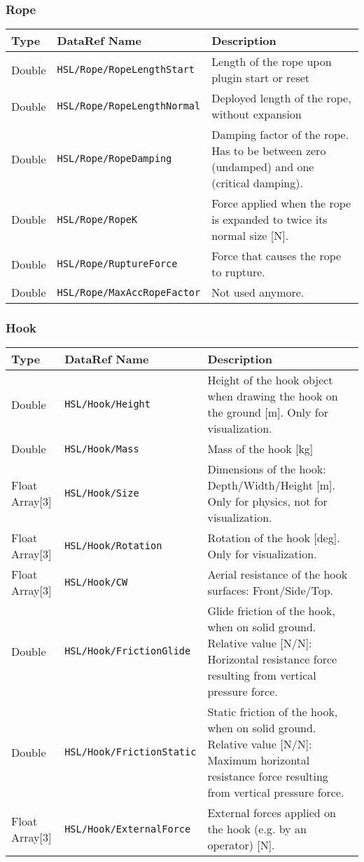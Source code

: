 \documentclass[10pt,a4]{scrartcl}
\begin{document}
\subsubsection{Rope}
\begin{tabularx}{\linewidth}{| l | l | X |} \hline
\textbf{Type} & \textbf{DataRef Name}& \textbf{Description}\\ \hline
Double & \texttt{HSL/Rope/RopeLengthStart} & Length of the rope upon plugin start or reset\\ \hline
Double & \texttt{HSL/Rope/RopeLengthNormal} & Deployed length of the rope, without expansion\\ \hline
Double & \texttt{HSL/Rope/RopeDamping} & Damping factor of the rope. Has to be between zero (undamped) and one (critical damping).\\ \hline
Double & \texttt{HSL/Rope/RopeK} & Force applied when the rope is expanded to twice its normal size [N].\\ \hline
Double & \texttt{HSL/Rope/RuptureForce} & Force that causes the rope to rupture.\\ \hline
Double & \texttt{HSL/Rope/MaxAccRopeFactor} & Not used anymore.\\ \hline
\end{tabularx}
\subsubsection{Hook}
\begin{tabularx}{\linewidth}{| l | l | X |} \hline
\textbf{Type} & \textbf{DataRef Name}& \textbf{Description}\\ \hline

Double & \texttt{HSL/Hook/Height} & Height of the hook object when drawing the hook on the ground [m]. Only for visualization.\\ \hline
Double & \texttt{HSL/Hook/Mass} & Mass of the hook [kg]\\ \hline
Float Array[3] & \texttt{HSL/Hook/Size} & Dimensions of the hook: Depth/Width/Height [m]. Only for physics, not for visualization.\\ \hline
Float Array[3] & \texttt{HSL/Hook/Rotation} & Rotation of the hook [deg]. Only for visualization.\\ \hline
Float Array[3] & \texttt{HSL/Hook/CW} & Aerial resistance of the hook surfaces: Front/Side/Top. \\ \hline
Double & \texttt{HSL/Hook/FrictionGlide} &  Glide friction of the hook, when on solid ground. Relative value [N/N]: Horizontal resistance force resulting from vertical pressure force.\\ \hline
Double & \texttt{HSL/Hook/FrictionStatic} & Static friction of the hook, when on solid ground. Relative value [N/N]: Maximum horizontal resistance force resulting from vertical pressure force.\\ \hline

Float Array[3] & \texttt{HSL/Hook/ExternalForce} & External forces applied on the hook (e.g. by an operator) [N].\\ \hline
\end{tabularx}
\end{document}
